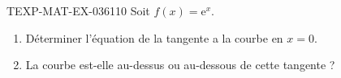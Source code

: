 \begin{exercice}{TEXP-MAT-EX-036}{1}{10}
Soit $f(x) = \mathrm{e}^x$.
\begin{enumerate}
  \item Déterminer l'équation de la tangente a la courbe en $x = 0$.
  \item La courbe est-elle au-dessus ou au-dessous de cette tangente ?
\end{enumerate}

\end{exercice}
